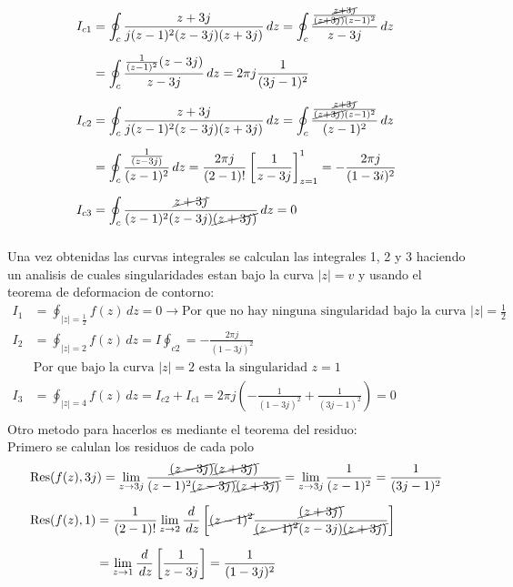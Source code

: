 \documentclass[12pt]{report}
\begin{document}
\begin{align*}
I_{c1} &= \oint_{c}\frac{z+3j}{j(z - 1)^2(z-3j)(z+3j)} \, dz =\oint_{c}\frac{\frac{\cancel{z+3j}}{\cancel{(z+3j)}(z-1)^2}}{z-3j} \, dz\\[6pt]
&= \oint_{c}\frac{\frac{1}{(z-1)^2}(z-3j)}{z-3j} \, dz = 2\pi j \frac{1}{(3j-1)^2}\\[6pt]
I_{c2} &= \oint_{c}\frac{z+3j}{j(z - 1)^2(z-3j)(z+3j)} \, dz =\oint_{c}\frac{\frac{\cancel{z+3j}}{\cancel{(z+3j)}(z-1)^2}}{(z-1)^2} \, dz\\[6pt]
&= \oint_{c}\frac{\frac{1}{(z-3j)}}{(z-1)^2} \, dz = \frac{2\pi j}{(2-1)!} \left[ \frac{1}{z-3j} \right]_{z=1}^1= -\frac{2\pi j}{(1-3i)^2} \\[6pt]
I_{c3} &= \oint_{c}\frac{\cancel{z+3j}}{(z - 1)^2(z-3j)\cancel{(z+3j)}} \, dz=0 \\[6pt]
\end{align*}


Una vez obtenidas las curvas integrales se calculan las integrales 1, 2 y 3 haciendo un analisis de cuales singularidades estan bajo la curva $|z|=v$ y usando el teorema de deformacion de contorno: \\

\begin{align*}
I_1&=\oint_{|z|=\frac{1}{2}}f(z) \, dz= 0 \rightarrow \text{Por que no hay ninguna singularidad bajo la curva $|z|=\frac{1}{2}$}\\[6pt]
I_2&=\oint_{|z|=2}f(z) \, dz = I \oint_{c2} = - \frac{2 \pi j}{(1-3j)^2}\\[6pt]
&\text{Por que bajo la curva $|z|=2$ esta la singularidad $z=1$}\\[12pt]
I_3&= \oint_{|z|=4}f(z) \, dz = I_{c2}+I_{c1}=2 \pi j \left( -\frac{1}{(1-3j)^2} + \frac{1}{(3j-1)^2} \right) = 0 \\[6pt]
\end{align*}
Otro metodo para hacerlos es mediante el teorema del residuo:\\
Primero se calulan los residuos de cada polo\\
\begin{align*}
&\text{Res}(f(z),3j)= \lim_{z \to 3j} \frac{\cancel{(z-3j)}\cancel{(z+3j)}}{(z-1)^2\cancel{(z-3j)}\cancel{(z+3j)}}= \lim_{z \to 3j} \frac{1}{(z-1)^2}=\frac{1}{(3j-1)^2} \\[6pt]
&\text{Res}(f(z),1)=\frac{1}{(2-1)!} \lim_{z \to 2} \frac{d}{\,dz} \left[ \cancel{(z-1)^2} \frac{\cancel{(z+3j)}}{\cancel{(z-1)^2}(z-3j) \cancel{(z+3j)}} \right]\\[6pt]
&\phantom{\text{Res}(f(z),1)}= \lim_{z \to 1} \frac{d}{\,dz} \left[ \frac{1}{z-3j} \right]= \frac{1}{(1-3j)^2}\\[6pt]
\end{align*}
\end{document}
